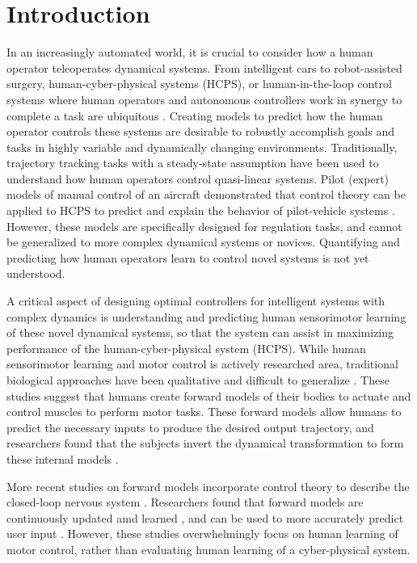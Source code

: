 \documentclass{ifacconf}
\begin{document}
\section{Introduction}
In an increasingly automated world, it is crucial to consider how a human operator teleoperates dynamical systems. From intelligent cars to robot-assisted surgery, human-cyber-physical systems (HCPS), or human-in-the-loop control systems where human operators and autonomous controllers work in synergy to complete a task are ubiquitous \cite{harriott2013modeling}. Creating models to predict how the human operator controls these systems are desirable to robustly accomplish goals and tasks in highly variable and dynamically changing environments. Traditionally, trajectory tracking tasks with a steady-state assumption have been used to understand how human operators control quasi-linear systems. Pilot (expert) models of manual control of an aircraft demonstrated that control theory can be applied to HCPS to predict and explain the behavior of pilot-vehicle systems \cite{mcruer1967review,mcruer1974mathematical,allen1979man,mcruer1969theory}. 
However, these models are specifically designed for regulation tasks, and cannot be generalized to more complex dynamical systems or novices. Quantifying and predicting how human operators learn to control novel systems is not yet understood.

A critical aspect of designing optimal controllers for intelligent systems with complex dynamics is understanding and predicting human sensorimotor learning of these novel dynamical systems, so that the system can assist in maximizing performance of the human-cyber-physical system (HCPS). While human sensorimotor learning and motor control is actively researched area, traditional biological approaches have been qualitative and difficult to generalize \cite{schwenk2009grand}. These studies suggest that humans create forward models of their bodies to actuate and control muscles to perform motor tasks. These forward models allow humans to predict the necessary inputs to produce the desired output trajectory, and researchers found that the subjects invert the dynamical transformation to form these internal models \cite{shadmehr1994adaptive}.  

More recent studies on forward models incorporate control theory to describe the closed-loop nervous system \cite{roth2014comparative,gawthrop2011intermittent,gawthrop2009predictive}. Researchers found that forward models are continuously updated amd learned \cite{desmurget2000forward}, and can be used to more accurately predict user input \cite{gawthrop2009predictive,gawthrop2011intermittent}.
However, these studies overwhelmingly focus on human learning of motor control, rather than evaluating human learning of a cyber-physical system.  
\end{document}
